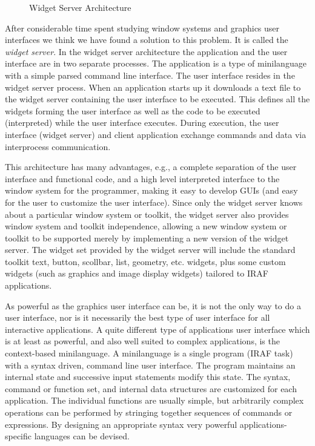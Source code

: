 \begin{figure}
\epsfxsize=5.0in 
\hspace{0.3in}{Figure 3.} Widget Server Architecture
\end{figure}

After considerable time spent studying window systems and graphics user
interfaces we think we have found a solution to this problem.  It is called
the {\it widget server}.  In the widget server architecture the application
and the user interface are in two separate processes.  The application is a
type of minilanguage with a simple parsed command line interface.  The user
interface resides in the widget server process.  When an application starts
up it downloads a text file to the widget server containing the user
interface to be executed.  This defines all the widgets forming the user
interface as well as the code to be executed (interpreted) while the user
interface executes.  During execution, the user interface (widget server)
and client application exchange commands and data via interprocess
communication.

This architecture has many advantages, e.g., a complete separation of the
user interface and functional code, and a high level interpreted interface
to the window system for the programmer, making it easy to develop GUIs (and
easy for the user to customize the user interface).  Since only the widget
server knows about a particular window system or toolkit, the widget server
also provides window system and toolkit independence, allowing a new window
system or toolkit to be supported merely by implementing a new version of the
widget server.  The widget set provided by the widget server will include
the standard toolkit text, button, scollbar, list, geometry, etc. widgets,
plus some custom widgets (such as graphics and image display widgets)
tailored to IRAF applications.

As powerful as the graphics user interface can be, it is not the only way to
do a user interface, nor is it necessarily the best type of user interface
for all interactive applications.  A quite different type of applications
user interface which is at least as powerful, and also well suited to
complex applications, is the context-based minilanguage.  A minilanguage is
a single program (IRAF task) with a syntax driven, command line user
interface.  The program maintains an internal state and successive input
statements modify this state.  The syntax, command or function set, and
internal data structures are customized for each application.  The
individual functions are usually simple, but arbitrarily complex operations
can be performed by stringing together sequences of commands or
expressions.  By designing an appropriate syntax very powerful
applications-specific languages can be devised.

